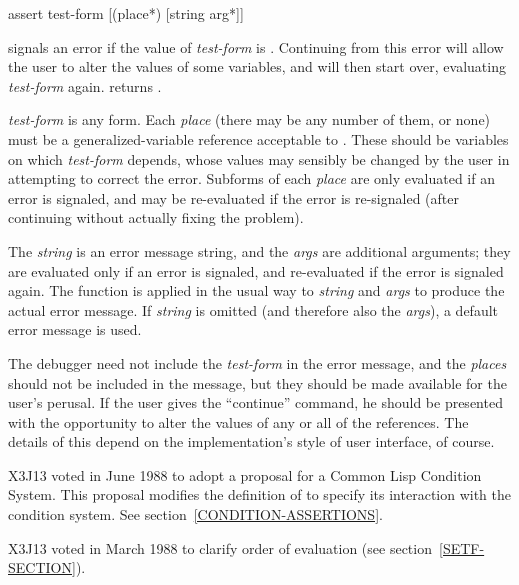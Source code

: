 \begin{defmac}
assert test-form [({place}*) [string {arg}*]]

\begin{obsolete}\noindent
{} signals an error if the value of {\it test-form} is {\false}.
Continuing 
from this error will allow the user to alter the values of some
variables, and  will then start over, evaluating 
{\it test-form} again.   returns {\false}.

{\it test-form} is any form.  Each {\it place} (there may be any number of
them, or none) must be a generalized-variable reference acceptable to
.  These should be variables on which {\it test-form} depends,
whose values may sensibly be changed by the user in attempting to correct
the error.  Subforms of each {\it place} are only evaluated if an error is
signaled, and may be re-evaluated if the error is re-signaled (after
continuing without actually fixing the problem).

The {\it string} is an
error message string, and the {\it args} are additional arguments; they are
evaluated only if an error is signaled, and re-evaluated if the error is
signaled again.
The function  is applied in the usual way to
{\it string} and {\it args} to produce
the actual error message.  If {\it string} is omitted (and therefore also
the {\it args}), a default error message is used.
\end{obsolete}

\beforenoterule
\begin{implementation}
The debugger need not include
the {\it test-form} in the error message,
and the {\it places} should not be included in the message, but they
should be made available for the user's perusal.
If the user gives the ``continue'' command, he should be
presented with the opportunity to alter the values of any or all of the
references.  The details of this depend on the
implementation's style of user interface, of course.
\end{implementation}
\afternoterule

\begin{new}
X3J13 voted in June 1988
to adopt a proposal for a Common Lisp Condition System. 
This proposal modifies the definition of  to specify its
interaction with the condition system.  See section~\ref{CONDITION-ASSERTIONS}.
\end{new}

\begin{newer}
X3J13 voted in March 1988 
to clarify order of evaluation (see section~\ref{SETF-SECTION}).
\end{newer}


\end{defmac}
